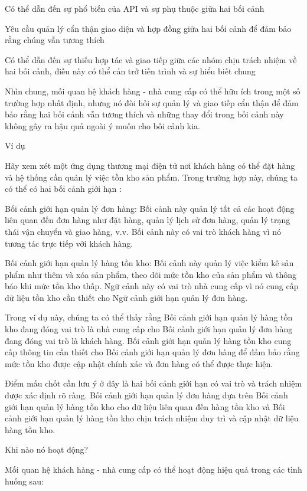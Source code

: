 Có thể dẫn đến sự phổ biến của API và sự phụ thuộc giữa hai bối cảnh

Yêu cầu quản lý cẩn thận giao diện và hợp đồng giữa hai bối cảnh để đảm bảo rằng chúng vẫn tương thích

Có thể dẫn đến sự thiếu hợp tác và giao tiếp giữa các nhóm chịu trách nhiệm về hai bối cảnh, điều này có thể cản trở tiến trình và sự hiểu biết chung

Nhìn chung, mối quan hệ khách hàng - nhà cung cấp có thể hữu ích trong một số trường hợp nhất định, nhưng nó đòi hỏi sự quản lý và giao tiếp cẩn thận để đảm bảo rằng hai bối cảnh vẫn tương thích và những thay đổi trong bối cảnh này không gây ra hậu quả ngoài ý muốn cho bối cảnh kia.

Ví dụ

Hãy xem xét một ứng dụng thương mại điện tử nơi khách hàng có thể đặt hàng và hệ thống cần quản lý việc tồn kho sản phẩm. Trong trường hợp này, chúng ta có thể có hai bối cảnh giới hạn :

Bối cảnh giới hạn quản lý đơn hàng: Bối cảnh này quản lý tất cả các hoạt động liên quan đến đơn hàng như đặt hàng, quản lý lịch sử đơn hàng, quản lý trạng thái vận chuyển và giao hàng, v.v. Bối cảnh này có vai trò khách hàng vì nó tương tác trực tiếp với khách hàng.

Bối cảnh giới hạn quản lý hàng tồn kho: Bối cảnh này quản lý việc kiểm kê sản phẩm như thêm và xóa sản phẩm, theo dõi mức tồn kho của sản phẩm và thông báo khi mức tồn kho thấp. Ngữ cảnh này có vai trò nhà cung cấp vì nó cung cấp dữ liệu tồn kho cần thiết cho Ngữ cảnh giới hạn quản lý đơn hàng.

Trong ví dụ này, chúng ta có thể thấy rằng Bối cảnh giới hạn quản lý hàng tồn kho đang đóng vai trò là nhà cung cấp cho Bối cảnh giới hạn quản lý đơn hàng đang đóng vai trò là khách hàng. Bối cảnh giới hạn quản lý hàng tồn kho cung cấp thông tin cần thiết cho Bối cảnh giới hạn quản lý đơn hàng để đảm bảo rằng mức tồn kho được cập nhật chính xác và đơn hàng có thể được thực hiện.

Điểm mấu chốt cần lưu ý ở đây là hai bối cảnh giới hạn có vai trò và trách nhiệm được xác định rõ ràng. Bối cảnh giới hạn quản lý đơn hàng dựa trên Bối cảnh giới hạn quản lý hàng tồn kho cho dữ liệu liên quan đến hàng tồn kho và Bối cảnh giới hạn quản lý hàng tồn kho chịu trách nhiệm duy trì và cập nhật dữ liệu hàng tồn kho.

Khi nào nó hoạt động?

Mối quan hệ khách hàng - nhà cung cấp có thể hoạt động hiệu quả trong các tình huống sau:

